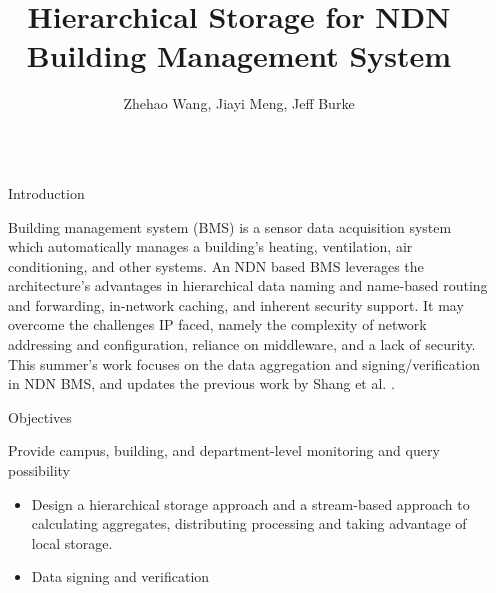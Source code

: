 \documentclass[final,hyperref={pdfpagelabels=false},16pt]{beamer}
\title{\huge Hierarchical Storage for NDN Building Management System}
\author[AuthorNames]{Zhehao Wang\inst{1}, Jiayi Meng\inst{2}, Jeff Burke\inst{3}}
\institute[Institutes]{\inst{1} \inst{2} \inst{3} UCLA REMAP}
\begin{document}

\begin{frame}[t] %

\begin{columns}[t] %

\begin{column}{.02\textwidth}\end{column} %

\begin{column}{.465\textwidth} %


\begin{block}{Introduction}

Building management system (BMS) is a sensor data acquisition system which automatically manages a building's heating, ventilation, air conditioning, and other systems. \newline
An NDN based BMS leverages the architecture's advantages in hierarchical data naming and name-based routing and forwarding, in-network caching, and inherent security support. It may overcome the challenges IP faced, namely the complexity of network addressing and configuration, reliance on middleware, and a lack of security. \newline
This summer's work focuses on the data aggregation and signing/verification in NDN BMS, and updates the previous work by Shang et al. \cite{wentao-bms}.

\end{block}


\begin{block}{Objectives}

Provide campus, building, and department-level monitoring and query possibility
\begin{itemize}
\item{Design a hierarchical storage approach and a stream-based approach to calculating aggregates, distributing processing and taking advantage of local storage.}
\item{Data signing and verification}
\end{itemize}


\end{block}
\end{column}
\end{columns}
\end{frame}
\end{document}

